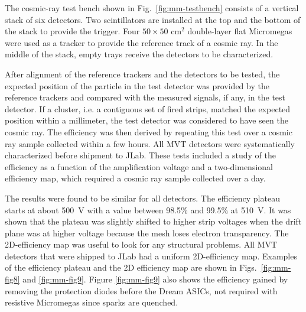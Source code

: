 The cosmic-ray test bench shown in Fig.~\ref{fig:mm-testbench} consists of a vertical stack of six detectors. Two scintillators
are installed at the top and the bottom of the stack to provide the trigger. Four $50 \times 50 \text{ cm}^2$ double-layer flat
Micromegas were used as a tracker to provide the reference track of a cosmic ray. In the middle of the stack, empty trays
receive the detectors to be characterized.

After alignment of the reference trackers and the detectors to be tested, the expected position of the particle in the test
detector was provided by the reference trackers and compared with the measured signals, if any, in the test detector. If a
cluster, i.e. a contiguous set of fired strips, matched the expected position within a millimeter, the test detector was considered to have seen the cosmic ray. The
efficiency was then derived by repeating this test over a cosmic ray sample collected within a few hours. All MVT detectors
were systematically characterized before shipment to JLab. These tests included a study of the efficiency as a function of
the amplification voltage and a two-dimensional efficiency map, which required a cosmic ray sample collected over a day.

The results were found to be similar for all detectors. The efficiency plateau starts at about 500~V with a value between
98.5\% and 99.5\% at 510~V. It was shown that the plateau was slightly shifted to higher strip voltages when the drift plane
was at higher voltage because the mesh loses electron transparency. The 2D-efficiency map was useful to look for any structural
problems. All MVT detectors that were shipped to JLab had a uniform 2D-efficiency map. Examples of the efficiency plateau
and the 2D efficiency map are shown in Figs.~\ref{fig:mm-fig8} and \ref{fig:mm-fig9}. Figure \ref{fig:mm-fig9} also shows the
efficiency gained by removing the protection diodes before the Dream ASICs,
not required with resistive Micromegas since sparks are quenched.

